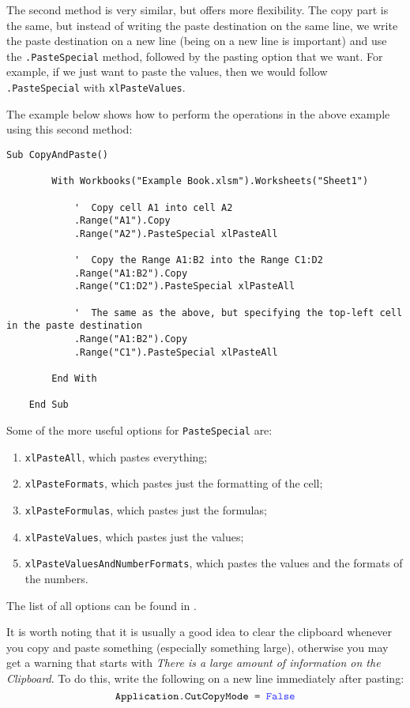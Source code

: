 \documentclass[11pt]{article}%
\begin{document}
The second method is very similar, but offers more flexibility. The copy part is the same, but instead of writing the paste destination on the same line, we write the paste destination on a new line (being on a new line is important) and use the \texttt{.PasteSpecial} method, followed by the pasting option that we want. For example, if we just want to paste the values, then we would follow \texttt{.PasteSpecial} with \texttt{xlPasteValues}.

The example below shows how to perform the operations in the above example using this second method:\\

\begin{lstlisting}[style=A]
    Sub CopyAndPaste()

        With Workbooks("Example Book.xlsm").Worksheets("Sheet1")

            '  Copy cell A1 into cell A2
            .Range("A1").Copy
            .Range("A2").PasteSpecial xlPasteAll

            '  Copy the Range A1:B2 into the Range C1:D2
            .Range("A1:B2").Copy
            .Range("C1:D2").PasteSpecial xlPasteAll

            '  The same as the above, but specifying the top-left cell in the paste destination
            .Range("A1:B2").Copy
            .Range("C1").PasteSpecial xlPasteAll

        End With

    End Sub
\end{lstlisting}

Some of the more useful options for \texttt{PasteSpecial} are:

\begin{enumerate}
    \item \texttt{xlPasteAll}, which pastes everything;
    \item \texttt{xlPasteFormats}, which pastes just the formatting of the cell;
    \item \texttt{xlPasteFormulas}, which pastes just the formulas;
    \item \texttt{xlPasteValues}, which pastes just the values;
    \item \texttt{xlPasteValuesAndNumberFormats}, which pastes the values and the formats of the numbers.
\end{enumerate}

The list of all options can be found in \cite{xlPasteTypeEnumeration}.

It is worth noting that it is usually a good idea to clear the clipboard whenever you copy and paste something (especially something large), otherwise you may get a warning that starts with \textit{There is a large amount of information on the Clipboard}. To do this, write the following on a new line immediately after pasting:
\[
\texttt{Application.CutCopyMode = \blue{False}}
\]
\end{document}
